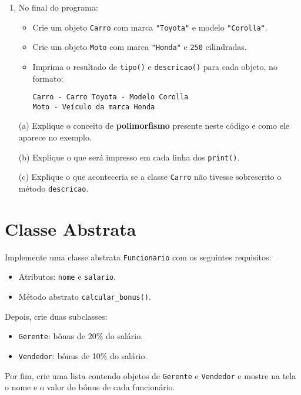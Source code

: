\begin{enumerate}
    \item No final do programa:
    \begin{itemize}
        \item Crie um objeto \texttt{Carro} com marca \texttt{"Toyota"} e modelo \texttt{"Corolla"}.
        \item Crie um objeto \texttt{Moto} com marca \texttt{"Honda"} e \texttt{250} cilindradas.
        \item Imprima o resultado de \texttt{tipo()} e \texttt{descricao()} para cada objeto, no formato:
        \begin{verbatim}
Carro - Carro Toyota - Modelo Corolla
Moto - Veículo da marca Honda
        \end{verbatim}
    \end{itemize}
\end{enumerate}
\begin{itemize}
    \item[(a)] Explique o conceito de \textbf{polimorfismo} presente neste código e como ele aparece no exemplo.
    \item[(b)] Explique o que será impresso em cada linha dos \texttt{print()}.
    \item[(c)] Explique o que aconteceria se a classe \texttt{Carro} não tivesse sobrescrito o método \texttt{descricao}.
\end{itemize}

\section{Classe Abstrata}
Implemente uma classe abstrata \texttt{Funcionario} com os seguintes requisitos:
\begin{itemize}
    \item Atributos: \texttt{nome} e \texttt{salario}.
    \item Método abstrato \texttt{calcular\_bonus()}.
\end{itemize}

Depois, crie duas subclasses:
\begin{itemize}
    \item \texttt{Gerente}: bônus de 20\% do salário.
    \item \texttt{Vendedor}: bônus de 10\% do salário.
\end{itemize}

Por fim, crie uma lista contendo objetos de \texttt{Gerente} e \texttt{Vendedor} e mostre na tela o nome e o valor do bônus de cada funcionário.

